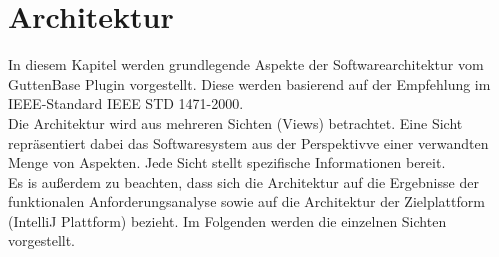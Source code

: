 




\section{Architektur}
In diesem Kapitel werden grundlegende Aspekte der Softwarearchitektur vom GuttenBase Plugin vorgestellt. Diese werden basierend auf der Empfehlung im IEEE-Standard IEEE STD 1471-2000.\\
Die Architektur wird aus mehreren Sichten (Views) betrachtet. Eine Sicht repräsentiert dabei das Softwaresystem aus der Perspektivve einer verwandten Menge von Aspekten. Jede Sicht stellt spezifische Informationen bereit.\\
Es is außerdem zu beachten, dass sich die Architektur auf die Ergebnisse der funktionalen Anforderungsanalyse sowie auf die Architektur der Zielplattform (IntelliJ Plattform) bezieht.
Im Folgenden werden die einzelnen Sichten vorgestellt.




